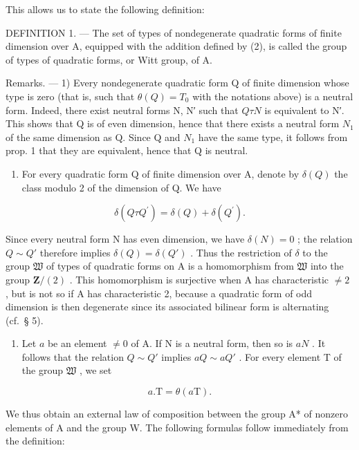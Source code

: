This allows us to state the following definition:

DEFINITION 1. --- The set of types of nondegenerate quadratic forms of finite dimension over A, equipped with the addition defined by (2), is called the group of types of quadratic forms, or Witt group, of A.

Remarks. --- 1) Every nondegenerate quadratic form Q of finite dimension whose type is zero (that is, such that \(\theta(Q) = T_0\) with the notations above) is a neutral form. Indeed, there exist neutral forms N, N′ such that \(Q \tau N\) is equivalent to N′. This shows that Q is of even dimension, hence that there exists a neutral form \(N_1\) of the same dimension as Q. Since Q and \(N_1\) have the same type, it follows from prop. 1 that they are equivalent, hence that Q is neutral.

\begin{enumerate}
\def\labelenumi{\arabic{enumi})}
\setcounter{enumi}{1}
\tightlist
\item
  For every quadratic form Q of finite dimension over A, denote by \(\delta(Q)\) the class modulo 2 of the dimension of Q. We have
\end{enumerate}

\[
\delta (Q \tau Q ^ {\prime}) = \delta (Q) + \delta (Q ^ {\prime}).
\]

Since every neutral form N has even dimension, we have \(\delta(N) = 0\) ; the relation \(Q \sim Q'\) therefore implies \(\delta(Q) = \delta(Q')\) . Thus the restriction of \(\delta\) to the group \(\mathfrak{W}\) of types of quadratic forms on A is a homomorphism from \(\mathfrak{W}\) into the group \(\mathbf{Z}/(2)\) . This homomorphism is surjective when A has characteristic \(\neq 2\) , but is not so if A has characteristic 2, because a quadratic form of odd dimension is then degenerate since its associated bilinear form is alternating (cf.~§ 5).

\begin{enumerate}
\def\labelenumi{\arabic{enumi})}
\setcounter{enumi}{2}
\tightlist
\item
  Let \(a\) be an element \(\neq 0\) of A. If N is a neutral form, then so is \(aN\) . It follows that the relation \(Q \sim Q'\) implies \(aQ \sim aQ'\) . For every element T of the group \(\mathfrak{W}\) , we set
\end{enumerate}

\[
a. \mathrm{T} = \theta (a \mathrm{T}).\tag{3}
\]

We thus obtain an external law of composition between the group A* of nonzero elements of A and the group W. The following formulas follow immediately from the definition:

